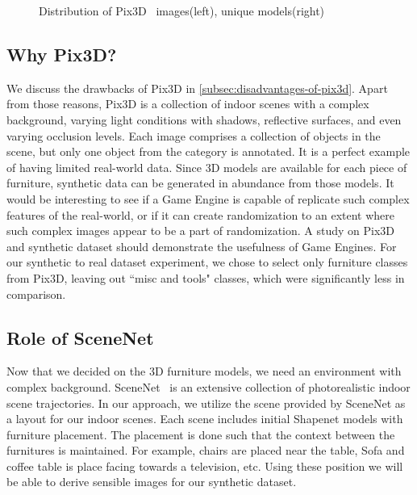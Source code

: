 \begin{figure}[!ht]
    \resizebox{0.49\textwidth}{6cm}{}
    \resizebox{0.49\textwidth}{6cm}{}
    \caption{Distribution of Pix3D~\cite{Sun2018} images(left), unique models(right)}
    \label{fig:pix3d_histogram}
\end{figure}

\subsection{Why Pix3D?}\label{subsec:why-pix3d?}
We discuss the drawbacks of Pix3D in \autoref{subsec:disadvantages-of-pix3d}.
Apart from those reasons, Pix3D is a collection of indoor scenes with a complex background, varying light conditions with shadows, reflective surfaces, and even varying occlusion levels.
Each image comprises a collection of objects in the scene, but only one object from the category is annotated.
It is a perfect example of having limited real-world data.
Since 3D models are available for each piece of furniture, synthetic data can be generated in abundance from those models.
It would be interesting to see if a Game Engine is capable of replicate such complex features of the real-world, or if it can create randomization to an extent where such complex images appear to be a part of randomization.
A study on Pix3D and synthetic dataset should demonstrate the usefulness of Game Engines.
For our synthetic to real dataset experiment, we chose to select only furniture classes from Pix3D, leaving out ``misc and tools" classes, which were significantly less in comparison.

\subsection{Role of SceneNet}\label{sec:role-of-scenenet}
Now that we decided on the 3D furniture models, we need an environment with complex background.
SceneNet~\cite{McCormac2017} is an extensive collection of photorealistic indoor scene trajectories.
In our approach, we utilize the scene provided by SceneNet as a layout for our indoor scenes.
Each scene includes initial Shapenet models with furniture placement.
The placement is done such that the context between the furnitures is maintained.
For example, chairs are placed near the table,
Sofa and coffee table is place facing towards a television, etc.
Using these position we will be able to derive sensible images for our synthetic dataset.

